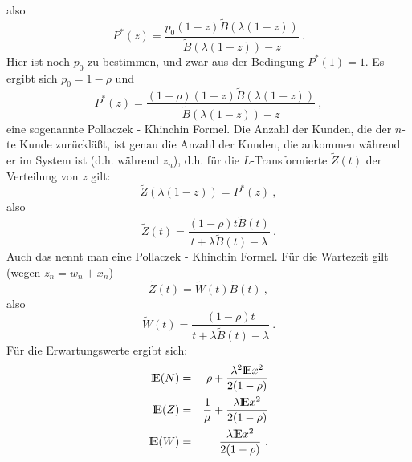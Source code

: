 also
\begin{displaymath}
P^{*}(z) = \frac{p_{0}(1-z) \tilde B ( \lambda (1-z))}{ \tilde B (
\lambda(1-z)) - z} ~.
\end{displaymath}
Hier ist noch $p_{0}$ zu bestimmen, und zwar aus der Bedingung $P^{*}(1) =
1$. Es ergibt sich $p_{0} = 1 - \rho$ und
\begin{displaymath}
P^{*}(z) = \frac{(1- \rho)(1-z) \tilde B ( \lambda (1-z))}{ \tilde B (
\lambda(1-z)) - z} ~,
\end{displaymath}
eine sogenannte Pollaczek - Khinchin Formel. Die Anzahl der Kunden, die der $n$-te
Kunde zurückläßt, ist genau die Anzahl der Kunden, die ankommen
während er im System ist (d.h. während $z_{n}$), d.h. für die
$L$-Transformierte $ \tilde Z (t)$ der Verteilung von $z$ gilt:
\begin{displaymath}
\tilde Z (\lambda(1-z)) = P^{*}(z) ~,
\end{displaymath}
also
\begin{displaymath}
\tilde Z (t) = \frac{(1- \rho)t \tilde B (t)}{t + \lambda \tilde B (t) -
\lambda} ~.
\end{displaymath}
Auch das nennt man eine Pollaczek - Khinchin Formel. Für die Wartezeit
gilt
(wegen $z_{n} = w_{n} + x_{n}$)
\begin{displaymath}
\tilde Z (t) = \tilde W (t) \tilde B(t) ~,
\end{displaymath}
also
\begin{displaymath}
\tilde W (t) = \frac{(1- \rho)t}{t + \lambda \tilde B (t) - \lambda} ~.
\end{displaymath}
Für die Erwartungswerte ergibt sich:
\begin{eqnarray*}
{\rm I\kern-0.2em E} (N) &=& \rho + \frac{\lambda^{2} {\rm I\kern-0.2em E} x^{2}}{2(1- \rho)} \\
{\rm I\kern-0.2em E} (Z) &=& \frac{1}{\mu} + \frac{\lambda {\rm I\kern-0.2em E} x^{2}}{2(1 - \rho)} \\
{\rm I\kern-0.2em E} (W) &=& \frac{\lambda {\rm I\kern-0.2em E} x^{2}}{2(1 - \rho)} ~.
\end{eqnarray*}

